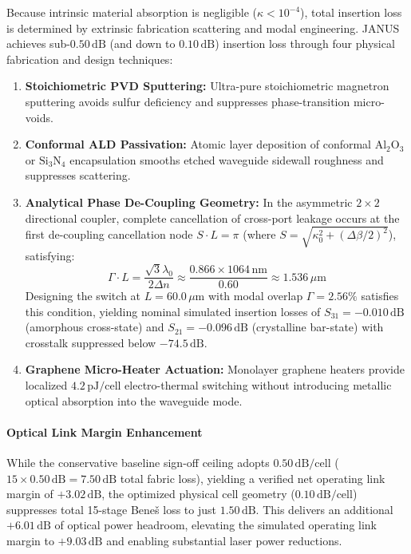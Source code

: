 \documentclass[journal]{IEEEtran}
\begin{document}
Because intrinsic material absorption is negligible ($\kappa < 10^{-4}$), total insertion loss is determined by extrinsic fabrication scattering and modal engineering. JANUS achieves sub-$0.50\,\mathrm{dB}$ (and down to $0.10\,\mathrm{dB}$) insertion loss through four physical fabrication and design techniques:
\begin{enumerate}
\item \textbf{Stoichiometric PVD Sputtering:} Ultra-pure stoichiometric magnetron sputtering avoids sulfur deficiency and suppresses phase-transition micro-voids.
\item \textbf{Conformal ALD Passivation:} Atomic layer deposition of conformal $\mathrm{Al_2O_3}$ or $\mathrm{Si_3N_4}$ encapsulation smooths etched waveguide sidewall roughness and suppresses scattering.
\item \textbf{Analytical Phase De-Coupling Geometry:} In the asymmetric $2 \times 2$ directional coupler, complete cancellation of cross-port leakage occurs at the first de-coupling cancellation node $S \cdot L = \pi$ (where $S = \sqrt{\kappa_0^2 + (\Delta\beta/2)^2}$), satisfying:
\begin{equation}
\Gamma \cdot L = \frac{\sqrt{3}\lambda_0}{2\Delta n} \approx \frac{0.866 \times 1064\,\mathrm{nm}}{0.60} \approx 1.536\,\mu\mathrm{m}
\end{equation}
Designing the switch at $L = 60.0\,\mu\mathrm{m}$ with modal overlap $\Gamma = 2.56\%$ satisfies this condition, yielding nominal simulated insertion losses of $S_{31} = -0.010\,\mathrm{dB}$ (amorphous cross-state) and $S_{21} = -0.096\,\mathrm{dB}$ (crystalline bar-state) with crosstalk suppressed below $-74.5\,\mathrm{dB}$.
\item \textbf{Graphene Micro-Heater Actuation:} Monolayer graphene heaters provide localized $4.2\,\mathrm{pJ/cell}$ electro-thermal switching without introducing metallic optical absorption into the waveguide mode.
\end{enumerate}

\paragraph{\textbf{Optical Link Margin Enhancement}}
While the conservative baseline sign-off ceiling adopts $0.50\,\mathrm{dB/cell}$ ($15 \times 0.50\,\mathrm{dB} = 7.50\,\mathrm{dB}$ total fabric loss), yielding a verified net operating link margin of $+3.02\,\mathrm{dB}$, the optimized physical cell geometry ($0.10\,\mathrm{dB/cell}$) suppresses total 15-stage Bene\v{s} loss to just $1.50\,\mathrm{dB}$. This delivers an additional $+6.01\,\mathrm{dB}$ of optical power headroom, elevating the simulated operating link margin to $\mathbf{+9.03\,\mathrm{dB}}$ and enabling substantial laser power reductions.
\end{document}
